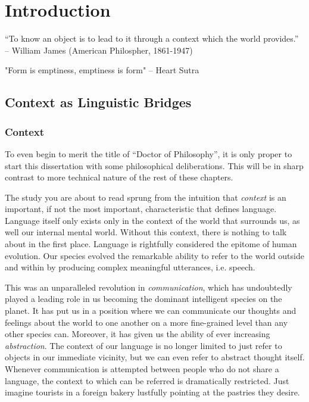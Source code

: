 \chapter{Introduction}

“To know an object is to lead to it through a context which the world
provides.” -- William James (American Philospher, 1861-1947)

"Form is emptiness, emptiness is form" -- Heart Sutra

\section{Context as Linguistic Bridges}

\subsection{Context}

To even begin to merit the title of ``Doctor of Philosophy'', it is only proper
to start this dissertation with some philosophical deliberations. This will be
in sharp contrast to more technical nature of the rest of these chapters.

The study you are about to read sprung from the intuition that \emph{context}
is an important, if not the most important, characteristic that defines
language. Language itself only exists only in the context of the world that
surrounds us, as well our internal mental world. Without this context, there is
nothing to talk about in the first place. Language is rightfully considered the
epitome of human evolution. Our species evolved the remarkable ability to refer to the
world outside and within by producing complex meaningful utterances, i.e. speech. 

This was an unparalleled revolution in \emph{communication}, which has
undoubtedly played a leading role in us becoming the dominant intelligent species
on the planet. It has put us in a position where we can communicate our
thoughts and feelings about the world to one another on a more fine-grained
level than any other species can. Moreover, it has given us the ability of ever increasing
\emph{abstraction}. The context of our language is no longer limited to just
refer to objects in our immediate vicinity, but we can even refer to abstract
thought itself. Whenever communication is attempted between people who do not
share a language, the context to which can be referred is dramatically restricted.
Just imagine tourists in a foreign bakery lustfully pointing at the
pastries they desire. 

